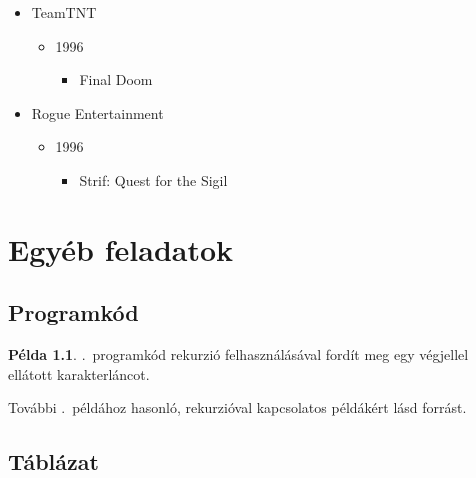 \documentclass{thesis-ekf}
\theoremstyle{definition}
\newtheorem{pelda}{Példa}[chapter]
\begin{document}
\begin{itemize}
    \item TeamTNT
        \begin{itemize}
            \item 1996
                \begin{itemize}
                    \item Final Doom
                \end{itemize}
        \end{itemize}
    \item Rogue Entertainment
        \begin{itemize}
            \item 1996
                \begin{itemize}
                    \item Strif: Quest for the Sigil
                \end{itemize}
        \end{itemize}
\end{itemize}
\cite[A motort használó játékok]{doomengine}

\chapter{Egyéb feladatok}

\section{Programkód}


\begin{pelda}
    .~programkód rekurzió felhasználásával fordít meg egy
    végjellel ellátott karakterláncot.
    \label{pld:rstrrev}
\end{pelda}

További .~példához hasonló, rekurzióval kapcsolatos példákért
lásd  forrást.

\section{Táblázat}
\end{document}
